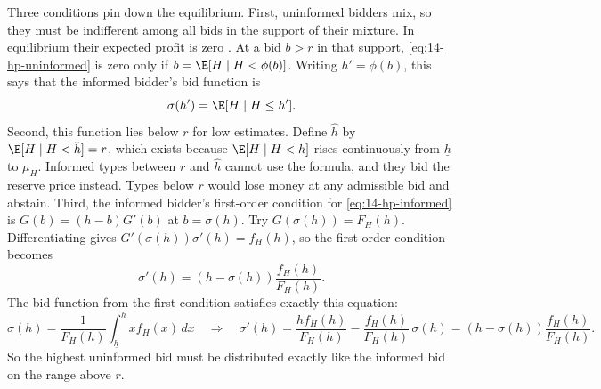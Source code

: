  Three conditions pin down the equilibrium. First, uninformed bidders mix,
so they must be indifferent among all bids in the support of their mixture. In equilibrium their expected
profit is zero \citep[p.~869]{HendricksPorter1988}. At a bid $b>r$ in that support,
\eqref{eq:14-hp-uninformed} is zero only if $b=\E[H\mid H<\phi(b)]$. Writing $h'=\phi(b)$, this says that the
informed bidder's bid function is
\begin{equation*}
  \sigma(h')=\E[H\mid H\le h'].
\end{equation*}
Second, this function lies below $r$ for low estimates. Define $\hat h$ by $\E[H\mid H<\hat h]=r$, which
exists because $\E[H\mid H<h]$ rises continuously from $\underline h$ to $\mu_H$. Informed types between $r$ and
$\hat h$ cannot use the formula, and they bid the reserve price instead. Types below $r$ would lose money at
any admissible bid and abstain. Third, the informed bidder's first-order condition for \eqref{eq:14-hp-informed}
is $G(b)=(h-b)G'(b)$ at $b=\sigma(h)$. Try $G(\sigma(h))=F_H(h)$. Differentiating gives
$G'(\sigma(h))\sigma'(h)=f_H(h)$, so the first-order condition becomes
\begin{equation*}
  \sigma'(h)=\left(h-\sigma(h)\right)\frac{f_H(h)}{F_H(h)}.
\end{equation*}
The bid function from the first condition satisfies exactly this equation:
\begin{equation*}
  \sigma(h)=\frac{1}{F_H(h)}\int_{\underline h}^h x f_H(x)\,dx
  \quad\Longrightarrow\quad
  \sigma'(h)=\frac{h f_H(h)}{F_H(h)}-\frac{f_H(h)}{F_H(h)}\,\sigma(h)
  =\left(h-\sigma(h)\right)\frac{f_H(h)}{F_H(h)}.
\end{equation*}
So the highest uninformed bid must be distributed exactly like the informed bid on the range above $r$.

